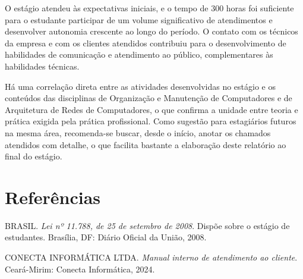 \documentclass[article,12pt,a4paper]{abntex2}
\begin{document}
O estágio atendeu às expectativas iniciais, e o tempo de 300 horas foi
suficiente para o estudante participar de um volume significativo de
atendimentos e desenvolver autonomia crescente ao longo do período. O
contato com os técnicos da empresa e com os clientes atendidos contribuiu
para o desenvolvimento de habilidades de comunicação e atendimento ao
público, complementares às habilidades técnicas.

Há uma correlação direta entre as atividades desenvolvidas no estágio e os
conteúdos das disciplinas de Organização e Manutenção de Computadores e de
Arquitetura de Redes de Computadores, o que confirma a unidade entre
teoria e prática exigida pela prática profissional. Como sugestão para
estagiários futuros na mesma área, recomenda-se buscar, desde o início,
anotar os chamados atendidos com detalhe, o que facilita bastante a
elaboração deste relatório ao final do estágio.

\postextual

\section*{Referências}

\newcommand{\referencia}[1]{\par\noindent\hangindent=1cm #1\par\medskip}

\referencia{BRASIL. \textit{Lei nº 11.788, de 25 de setembro de 2008}.
Dispõe sobre o estágio de estudantes. Brasília, DF: Diário Oficial da
União, 2008.}

\referencia{CONECTA INFORMÁTICA LTDA. \textit{Manual interno de
atendimento ao cliente}. Ceará-Mirim: Conecta Informática, 2024.}
\end{document}
